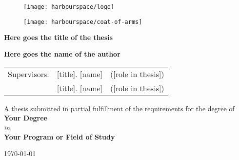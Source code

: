 \begin{figure}[h]
    \texttt{[image: harbourspace/logo]}
    \centering
\end{figure}

\vspace{1cm}

\begin{figure}[h]
    \texttt{[image: harbourspace/coat-of-arms]}
    \centering
\end{figure}

\vspace{1cm}

\begin{center}
    \LARGE\textbf{Here goes the title of the thesis}
\end{center}

\vspace{0.5cm}

\begin{center}
    \Large\textbf{Here goes the name of the author}
\end{center}

\begin{center}
    \begin{tabular}{lll}
        Supervisors: & [title]. [name] & ([role in thesis]) \\
                     & [title]. [name] & ([role in thesis])
    \end{tabular}
\end{center}

\vspace{0.5cm}

\vfill

\begin{center}
    A thesis submitted in partial fulfillment
    of the requirements for the degree of\\[0.1cm]
    \textbf{Your Degree}\\[0.5cm]
    \textit{in}\\[0.1cm]
    \textbf{Your Program or Field of Study}\\[1cm]
\end{center}

\vspace{0.5cm}

\begin{center}
    \today
\end{center}